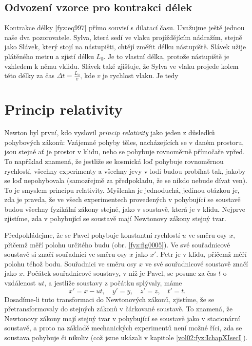     \subsection{Odvození vzorce pro kontrakci délek}\label{fyz:IchapXVsecIIssecI}  
      Kontrakce délky \eqref{fyz:eq997} přímo souvisí s dilatací času. Uvažujme ještě jednou naše
      dva pozorovatele. Sylva, která sedí ve vlaku projíždějícím nádražím, stejně jako Slávek, který
      stojí na nástupišti, chtějí změřit délku nástupiště. Slávek užije plátěného metru a zjistí
      délku \(L_0\). Je to vlastní délka, protože nástupiště je vzhledem k němu vklidu. Slávek také
      zjišťuje, že Sylva ve vlaku projede kolem této délky za čas \(\Delta t = \frac{L_0}{v}\), kde
      \(v\) je rychlost vlaku. Je tedy

  \section{Princip relativity}\label{fyz:IchapXVsecIII}     
    Newton byl první, kdo vyslovil \emph{princip relativity} jako jeden z důsledků pohybových
    zákonů: Vzájemné pohyby těles, nacházejících se v daném prostoru, jsou stejné ať je prostor v
    klidu, nebo se pohybuje rovnoměrně přímočaře vpřed. To například znamená, že jestliže se
    kosmická loď pohybuje rovnoměrnou rychlostí, všechny experimenty a všechny jevy v lodi budou
    probíhat tak, jakoby se loď nepohybovala (samozřejmě za předpokladu, že se nikdo nebude dívat
    ven). To je smyslem principu relativity. Myšlenka je jednoduchá, jedinou otázkou je, zda je
    pravda, že ve všech experimentech provedených v pohybující se soustavě budou všechny fyzikální
    zákony stejné, jako v soustavě, která je v klidu. Nejprve zjistíme, zda v pohybující se soustavě
    mají Newtonovy zákony stejný tvar.

  
    Předpokládejme, že se Pavel pohybuje konstantní rychlostí \(u\) ve směru osy \(x\), přičemž měří
    polohu určitého budu (obr. \ref{fyz:fig0005}). Ve své souřadnicové soustavě si značí souřadnici
    ve směru osy \(x\) jako \(x'\). Petr je v klidu, přičemž měří polohu téhož bodu. Souřadnici ve
    směru osy \(x\) ve své souřadnicové soustavě značí jako \(x\). Počátek souřadnicové soustavy, v
    níž je Pavel, se posune za čas \(t\) o vzdálenost \(ut\), a jestliže soustavy z počátku
    splývaly, máme
    \begin{equation}\label{fyz:eq183}
      x' = x - ut, \quad y' = y, \quad z' = z, \quad t' = t. 
    \end{equation}
    Dosadíme-li tuto transformaci do Newtonových zákonů, zjistíme, že se přetransformovaly do
    stejných zákonů v čárkované soustavě. To znamená, že Newtonovy zákony mají stejný tvar v
    pohybující se soustavě jako v stacionární soustavě, a proto na základě mechanických experimentů
    není možné říci, zda se soustava pohybuje či nikoliv (což jsme ukázali v kapitole
    \ref{vol02:fyz:IchapXIsecI}). 
    
